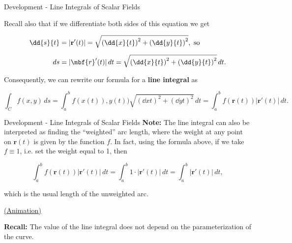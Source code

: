 \documentclass[11pt,english,
handout
]{beamer}
\begin{document}
\begin{frame}[t]{Development - Line Integrals of Scalar Fields}
\small

Recall also that if we differentiate both sides of this equation we get

\begin{align*}
\dd{s}{t}&=|\mathbf{r}'(t)|=\sqrt{\left(\dd{x}{t}\right)^2+\left(\dd{y}{t}\right)^2},\text{ so}\\[2mm]
ds&=|\mbf{r}'(t)|\,dt=\sqrt{\left(\dd{x}{t}\right)^2+\left(\dd{y}{t}\right)^2}\,dt.
\end{align*}\pause 

Consequently, we can rewrite our formula for a \textbf{line integral} as



\[\boxed{
\int_Cf(x,y)\,ds=\int_a^bf(x(t)),y(t))\sqrt{\left(\dd{x}{t}\right)^2+\left(\dd{y}{t}\right)^2}\,dt=\int_a^bf(\mathbf{r}(t))|\mathbf{r}'(t)|\,dt.
}\]
\end{frame}








\begin{frame}[t]{Development - Line Integrals of Scalar Fields}
\small
\textbf{Note:} The line integral can also be interpreted as finding the ``weighted'' arc length, where the weight at any point on $\mathbf{r}(t)$ is given by the function $f$. \pause In fact, using the formula above, if we take $f\equiv 1$, i.e. set the weight equal to 1, then 

\[
\int_a^bf(\mathbf{r}(t))|\mathbf{r}'(t)|\,dt=\int_a^b1\cdot|\mathbf{r}'(t)|\,dt=\int_a^b|\mathbf{r}'(t)|\,dt,
\]

which is the usual length of the unweighted arc.

\lspace
\href{https://upload.wikimedia.org/wikipedia/commons/4/42/Line_integral_of_scalar_field.gif}{(Animation)}

\lspace
\textbf{Recall:} The value of the line integral does not depend on the parameterization of the curve.
\end{frame}
\end{document}
